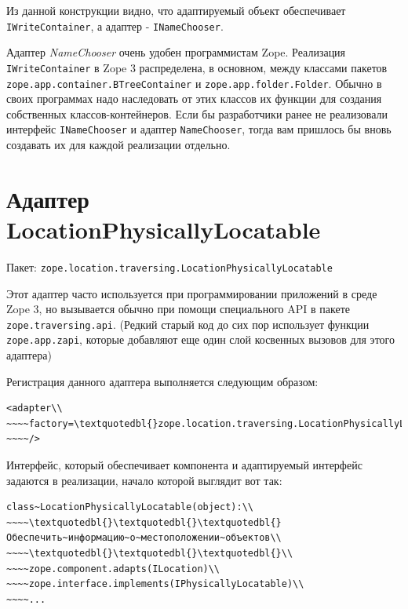 \documentclass[a4paper,openany,twoside,draft]{book}
\providecommand*{\DUroletitlereference}[1]{\textsl{#1}}
\begin{document}
Из данной конструкции видно, что адаптируемый объект обеспечивает
\texttt{IWriteContainer}, а адаптер - \texttt{INameChooser}.

Адаптер \DUroletitlereference{NameChooser} очень удобен программистам Zope.  Реализация
\texttt{IWriteContainer} в Zope 3 распределена, в основном, между классами
пакетов \texttt{zope.app.container.BTreeContainer} и
\texttt{zope.app.folder.Folder}.  Обычно в своих программах надо
наследовать от этих классов их функции для создания собственных
классов-контейнеров.  Если бы разработчики ранее не реализовали
интерфейс \texttt{INameChooser} и адаптер \texttt{NameChooser}, тогда вам
пришлось бы вновь создавать их для каждой реализации отдельно.


\section{Адаптер LocationPhysicallyLocatable%
  \label{locationphysicallylocatable}%
}

Пакет: \texttt{zope.location.traversing.LocationPhysicallyLocatable}

Этот адаптер часто используется при программировании приложений в
среде Zope 3, но вызывается обычно при помощи специального API в
пакете \texttt{zope.traversing.api}.  (Редкий старый код до сих пор
использует функции \texttt{zope.app.zapi}, которые добавляют еще один слой
косвенных вызовов для этого адаптера)

Регистрация данного адаптера выполняется следующим образом:

\begin{verbatim}
<adapter\\
~~~~factory=\textquotedbl{}zope.location.traversing.LocationPhysicallyLocatable\textquotedbl{}\\
~~~~/>
\end{verbatim}

Интерфейс, который обеспечивает компонента и адаптируемый интерфейс
задаются в реализации, начало которой выглядит вот так:

\begin{verbatim}
class~LocationPhysicallyLocatable(object):\\
~~~~\textquotedbl{}\textquotedbl{}\textquotedbl{}Обеспечить~информацию~о~местоположении~объектов\\
~~~~\textquotedbl{}\textquotedbl{}\textquotedbl{}\\
~~~~zope.component.adapts(ILocation)\\
~~~~zope.interface.implements(IPhysicallyLocatable)\\
~~~~...
\end{verbatim}
\end{document}
